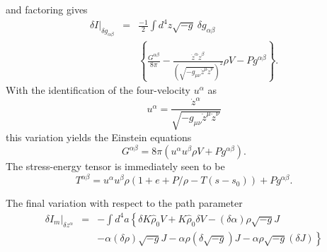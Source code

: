 and factoring gives
\begin{eqnarray}
\delta I \vert_{\delta g_{\alpha \beta}} 
	& = & 
		\frac{-1}{2} 
		\int d^4z \sqrt{-g} \ \delta g_{\alpha \beta} \nonumber \\
	& & 	\left\{
			\frac{G^{\alpha \beta}}{8 \pi} - \frac{\dot z^{\alpha} 
			\dot z^{\beta}}{\left(\sqrt{ -g_{\mu \nu} \dot z^{\mu} \dot
			z^{\nu}}\right)^{2}} \rho V - P g^{\alpha \beta}
		\right\}.
\end{eqnarray}
With the identification of the four-velocity $u^{\alpha}$ as 
\begin{equation}
u^{\alpha} = \frac{\dot z^{\alpha}}{\sqrt{ -g_{\mu \nu} \dot z^{\mu} \dot z^{\nu}}}
\end{equation}
this variation yields the Einstein equations
\begin{equation}
G^{\alpha \beta} = 8 \pi
		\left( 
			u^{\alpha} u^{\beta}\rho V + P g^{\alpha \beta}
		\right).
\end{equation}
The stress-energy tensor is immediately seen to be 
\begin{equation}\label{s_e_t}
T^{\alpha \beta} = u^{\alpha} u^{\beta}\rho \left(1 + e + P/\rho - T(s-s_{0})\right) + P g^{\alpha \beta}.
\end{equation}

The final variation with respect to the path parameter 
\begin{eqnarray}
\delta I_{m} \vert_{\delta z^{\alpha}} 
	& = & 
	- \int d^4a \! 
	\left\{ 
		\delta K {\hat \rho}_{0} V + K {\hat \rho}_{0} \delta V 
		- (\delta \alpha) \rho \sqrt{-g} J 
	\right. \nonumber \\
	& &
	\left.
		- \alpha (\delta \rho) \sqrt{-g} J 
		- \alpha \rho (\delta \sqrt{-g}) J 
		- \alpha \rho \sqrt{-g} (\delta J) 
	\right\}
\end{eqnarray}

